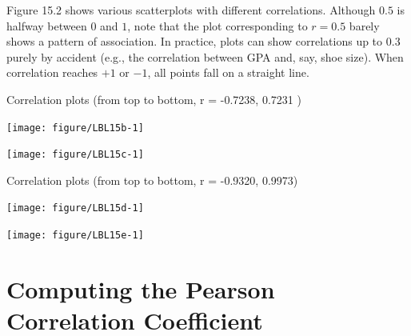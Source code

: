 \documentclass[11pt, chapterprefix=true]{scrbook}\usepackage[]{graphicx}\usepackage[]{color}
\begin{document}
Figure 15.2 shows various scatterplots with different correlations.  Although $0.5$ is halfway between $0$ and $1$, note that the plot corresponding to $r = 0.5$ barely shows a pattern of association.  In practice, plots can show correlations up to $0.3$ purely by accident (e.g., the correlation between GPA and, say, shoe size).  When correlation reaches $+1$ or $-1$, all points fall on a straight line.





\begin{minipage}[ht]{7.1cm}

Correlation plots (from top to bottom, r = -0.7238, 0.7231 )




{\centering \texttt{[image: figure/LBL15b-1]} 

}





{\centering \texttt{[image: figure/LBL15c-1]} 

}




\end{minipage} \hfill
\begin{minipage}[ht]{7.1cm}


Correlation plots (from top to bottom, r = -0.9320, 0.9973)




{\centering \texttt{[image: figure/LBL15d-1]} 

}





{\centering \texttt{[image: figure/LBL15e-1]} 

}



\end{minipage}

\section{Computing the Pearson Correlation Coefficient}
\end{document}
